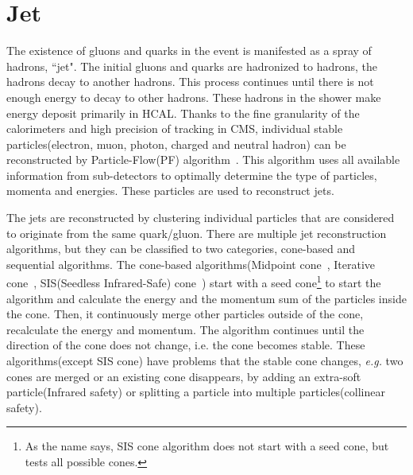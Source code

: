 \section{ Jet }
\label{sec:jet_reco}

The existence of gluons and quarks in the event is manifested as a spray of 
hadrons, ``jet". The initial gluons and quarks are hadronized to hadrons, 
the hadrons decay to another hadrons. This process continues until 
there is not enough energy to decay to other hadrons. These hadrons in the 
shower make energy deposit primarily in HCAL. 
Thanks to the fine granularity of the calorimeters and high precision of tracking in CMS, 
individual stable particles(electron, muon, photon, charged and neutral hadron) 
can be reconstructed by Particle-Flow(PF) algorithm~\cite{PFalgo}. 
This algorithm uses all available information from sub-detectors 
to optimally determine the type of particles, momenta and energies. 
These particles are used to reconstruct jets. 

The jets are reconstructed by clustering individual particles
that are considered to originate from the same quark/gluon.  
There are multiple jet reconstruction algorithms, but they 
can be classified to two categories, cone-based and sequential algorithms. 
The cone-based algorithms(Midpoint cone~\cite{Blazey:2000qt}, 
Iterative cone~\cite{PhysRevD.45.1448,PhysRevD.53.6000}, 
SIS(Seedless Infrared-Safe) cone~\cite{Salam:2007xv}) 
start with a seed cone\footnote{As the name says, 
SIS cone algorithm does not start with a seed cone, but tests all possible cones.} 
to start the algorithm and calculate the energy 
and the momentum sum of the particles inside the cone. 
Then, it continuously merge other particles outside of the cone,
recalculate the energy and momentum. The algorithm continues 
until the direction of the cone does not change, i.e. the cone becomes stable. 
These algorithms(except SIS cone) have problems that the stable cone 
changes, \textit{e.g.} two cones are merged or an existing cone disappears,   
by adding an extra-soft particle(Infrared safety) 
or splitting a particle into multiple particles(collinear safety). 

